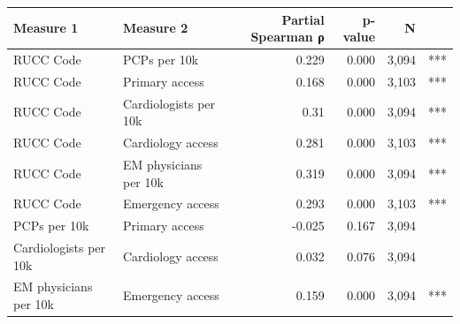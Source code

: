\begin{table}[ht]
\centering
\small
\begin{tabular}{llrrrr}
\toprule
Measure 1 & Measure 2 & Partial Spearman ρ & p-value & N &  \\
\midrule
RUCC Code & PCPs per 10k & 0.229 & 0.000 & 3,094 & *** \\
RUCC Code & Primary access & 0.168 & 0.000 & 3,103 & *** \\
RUCC Code & Cardiologists per 10k & 0.31 & 0.000 & 3,094 & *** \\
RUCC Code & Cardiology access & 0.281 & 0.000 & 3,103 & *** \\
RUCC Code & EM physicians per 10k & 0.319 & 0.000 & 3,094 & *** \\
RUCC Code & Emergency access & 0.293 & 0.000 & 3,103 & *** \\
PCPs per 10k & Primary access & -0.025 & 0.167 & 3,094 &  \\
Cardiologists per 10k & Cardiology access & 0.032 & 0.076 & 3,094 &  \\
EM physicians per 10k & Emergency access & 0.159 & 0.000 & 3,094 & *** \\
\bottomrule
\end{tabular}
\end{table}
